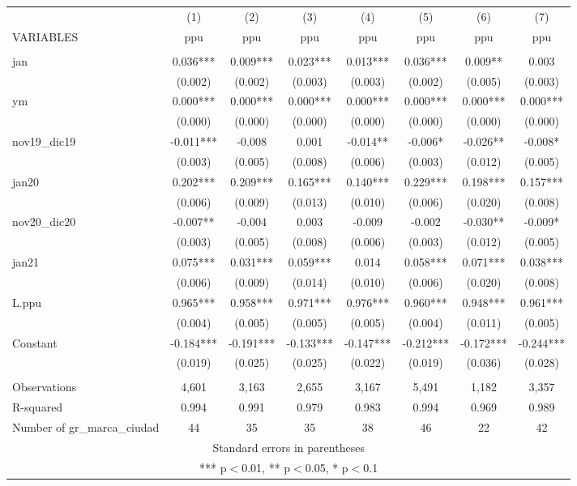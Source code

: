 \begin{tabular}{lccccccc} \hline
 & (1) & (2) & (3) & (4) & (5) & (6) & (7) \\
VARIABLES & ppu & ppu & ppu & ppu & ppu & ppu & ppu \\ \hline
 &  &  &  &  &  &  &  \\
jan & 0.036*** & 0.009*** & 0.023*** & 0.013*** & 0.036*** & 0.009** & 0.003 \\
 & (0.002) & (0.002) & (0.003) & (0.003) & (0.002) & (0.005) & (0.003) \\
ym & 0.000*** & 0.000*** & 0.000*** & 0.000*** & 0.000*** & 0.000*** & 0.000*** \\
 & (0.000) & (0.000) & (0.000) & (0.000) & (0.000) & (0.000) & (0.000) \\
nov19\_dic19 & -0.011*** & -0.008 & 0.001 & -0.014** & -0.006* & -0.026** & -0.008* \\
 & (0.003) & (0.005) & (0.008) & (0.006) & (0.003) & (0.012) & (0.005) \\
jan20 & 0.202*** & 0.209*** & 0.165*** & 0.140*** & 0.229*** & 0.198*** & 0.157*** \\
 & (0.006) & (0.009) & (0.013) & (0.010) & (0.006) & (0.020) & (0.008) \\
nov20\_dic20 & -0.007** & -0.004 & 0.003 & -0.009 & -0.002 & -0.030** & -0.009* \\
 & (0.003) & (0.005) & (0.008) & (0.006) & (0.003) & (0.012) & (0.005) \\
jan21 & 0.075*** & 0.031*** & 0.059*** & 0.014 & 0.058*** & 0.071*** & 0.038*** \\
 & (0.006) & (0.009) & (0.014) & (0.010) & (0.006) & (0.020) & (0.008) \\
L.ppu & 0.965*** & 0.958*** & 0.971*** & 0.976*** & 0.960*** & 0.948*** & 0.961*** \\
 & (0.004) & (0.005) & (0.005) & (0.005) & (0.004) & (0.011) & (0.005) \\
Constant & -0.184*** & -0.191*** & -0.133*** & -0.147*** & -0.212*** & -0.172*** & -0.244*** \\
 & (0.019) & (0.025) & (0.025) & (0.022) & (0.019) & (0.036) & (0.028) \\
 &  &  &  &  &  &  &  \\
Observations & 4,601 & 3,163 & 2,655 & 3,167 & 5,491 & 1,182 & 3,357 \\
R-squared & 0.994 & 0.991 & 0.979 & 0.983 & 0.994 & 0.969 & 0.989 \\
 Number of gr\_marca\_ciudad & 44 & 35 & 35 & 38 & 46 & 22 & 42 \\ \hline
\multicolumn{8}{c}{ Standard errors in parentheses} \\
\multicolumn{8}{c}{ *** p$<$0.01, ** p$<$0.05, * p$<$0.1} \\
\end{tabular}
